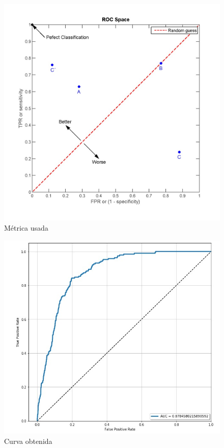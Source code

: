 \documentclass[a4paper ,12pt]{article}
\begin{document}
\begin{figure}[H]
	\centering
	\includegraphics[width=1.1\textwidth, height=0.75\textheight]{roc_auc}
	\caption{\label{fig:01} Métrica usada }
\end{figure}

\begin{center}
	
\begin{figure}[H]
	\centering
	\includegraphics[width=1.1\textwidth , height=0.75\textheight]{roc_propia}
	\caption{\label{fig:02} Curva obtenida }
\end{figure}

\end{center}
\end{document}

